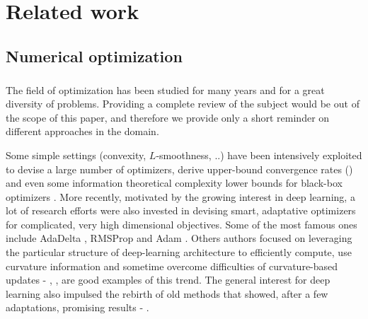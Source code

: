 \chapter{Related work}
	{
		\label{chap::related}
		\section{Numerical optimization}
		{
			\paragraph{} The field of optimization has been studied for many years and for a great diversity of problems. Providing a complete review of the subject would be out of the scope of this paper, and therefore we provide only a short reminder on different approaches in the domain.  
	
	Some simple settings (convexity, $L$-smoothness, ..) have been intensively exploited to devise a large number of optimizers, derive upper-bound convergence rates (\cite{nemirovskii1983problem}) and even some information theoretical complexity lower bounds for black-box optimizers \cite{agarwal2009information}. More recently, motivated by the growing interest in deep learning, a lot of research efforts were also invested in devising smart, adaptative optimizers for complicated, very high dimensional objectives. Some of the most famous ones include AdaDelta \cite{zeiler2012adadelta}, RMSProp \cite{hinton2012rms} and Adam \cite{kingma2014adam}. Others authors focused on leveraging the particular structure of deep-learning architecture to efficiently compute, use curvature information and sometime overcome difficulties of curvature-based updates - \cite{vinyals2012krylov}, \cite{martens2010deep}, \cite{arjovsky2015saddle} are good examples of this trend. The general interest for deep learning also impulsed the rebirth of old methods that showed, after a few adaptations, promising results - \cite{hazan2016graduated}. 
	
}}
